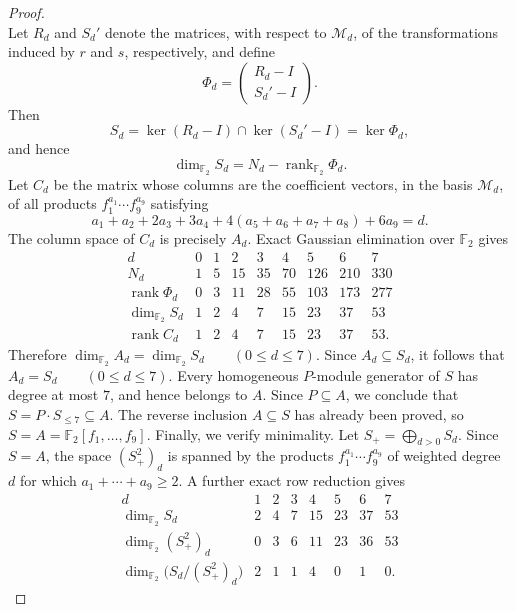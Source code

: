 \documentclass[11pt]{article}
\theoremstyle{definition}
\begin{document}
\begin{proof}
\[			\]
			Let \(R_d\) and \(S_d'\) denote the matrices, with respect to
			\(\mathcal M_d\), of the transformations induced by \(r\) and \(s\),
			respectively, and define
			\[
			\Phi_d=
			\begin{pmatrix}
			R_d-I\\ S_d'-I
			\end{pmatrix}.
			\]
			Then
			\[
			S_d=\ker(R_d-I)\cap\ker(S_d'-I)=\ker\Phi_d,
			\]
			and hence
			\[
			\dim_{\mathbb F_2}S_d=N_d-\operatorname{rank}_{\mathbb F_2}\Phi_d.
			\]
			Let \(C_d\) be the matrix whose columns are the coefficient vectors,
			in the basis \(\mathcal M_d\), of all products
			\(f_1^{a_1}\cdots f_9^{a_9}\) satisfying
			\[
			a_{1}+a_{2}+2a_{3}+3a_{4}
			+4(a_{5}+a_{6}+a_{7}+a_{8})+6a_{9}=d.
			\]
			The column space of \(C_{d}\) is precisely \(A_{d}\). Exact Gaussian elimination over \(\mathbb F_{2}\) gives
			\[
			\begin{array}{c|rrrrrrrr}
				d&0&1&2&3&4&5&6&7\\ \hline
				N_{d}
				&1&5&15&35&70&126&210&330\\
				\operatorname{rank}\Phi_{d}
				&0&3&11&28&55&103&173&277\\
				\dim_{\mathbb F_{2}}S_{d}
				&1&2&4&7&15&23&37&53\\
				\operatorname{rank}C_{d}
				&1&2&4&7&15&23&37&53.
			\end{array}
			\]
			Therefore $\dim_{\mathbb F_{2}}A_{d} =\dim_{\mathbb F_{2}}S_{d} \qquad(0\leq d\leq7)$. Since \(A_{d}\subseteq S_{d}\), it follows that $A_{d}=S_{d} \qquad(0\leq d\leq7)$. Every homogeneous \(P\)-module generator of \(S\) has degree at most \(7\), and hence belongs to \(A\). Since \(P\subseteq A\), we conclude that $ S=P\cdot S_{\leq7}\subseteq A$. The reverse inclusion \(A\subseteq S\) has already been proved, so $S=A=\mathbb F_{2}[f_{1},\ldots,f_{9}]$. Finally, we verify minimality. Let $S_{+}=\bigoplus_{d>0}S_{d}$. Since \(S=A\), the space \((S_{+}^{2})_{d}\) is spanned by the products $f_{1}^{a_{1}}\cdots f_{9}^{a_{9}}$ of weighted degree \(d\) for which $a_{1}+\cdots+a_{9}\geq2$. A further exact row reduction gives
			\[
			\begin{array}{c|rrrrrrr}
				d&1&2&3&4&5&6&7\\ \hline
				\dim_{\mathbb F_{2}}S_{d}
				&2&4&7&15&23&37&53\\
				\dim_{\mathbb F_{2}}(S_{+}^{2})_{d}
				&0&3&6&11&23&36&53\\ \hline
				\dim_{\mathbb F_{2}}
				\bigl(S_{d}/(S_{+}^{2})_{d}\bigr)
				&2&1&1&4&0&1&0.

\end{array}\]
\end{proof}
\end{document}
